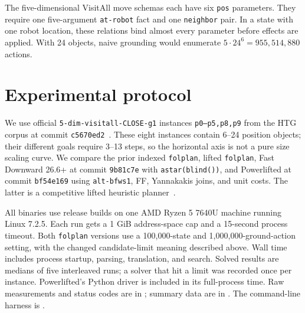 \documentclass[10pt,a4paper]{article}
\begin{document}
The five-dimensional VisitAll move schemas each have six \texttt{pos}
parameters. They require one five-argument \texttt{at-robot} fact and one
\texttt{neighbor} pair. In a state with one robot location, these relations
bind almost every parameter before effects are applied. With 24 objects,
naive grounding would enumerate $5\cdot24^6=955{,}514{,}880$ actions.

\section{Experimental protocol}
We use official \texttt{5-dim-visitall-CLOSE-g1} instances
\texttt{p0--p5,p8,p9} from the HTG corpus at commit
\texttt{c5670ed2}~\cite{htg}.
These eight instances contain 6--24 position objects; their different
goals require 3--13 steps, so the horizontal axis is not a pure size
scaling curve. We compare the prior indexed \texttt{folplan}, lifted
\texttt{folplan}, Fast Downward 26.6+ at commit \texttt{9b81c7e} with
\texttt{astar(blind())}, and Powerlifted at commit \texttt{bf54e169}
using \texttt{alt-bfws1}, FF, Yannakakis joins, and unit costs. The latter
is a competitive lifted heuristic planner~\cite{powerlifted}.

All binaries use release builds on one AMD Ryzen 5 7640U machine running
Linux 7.2.5. Each run gets a 1 GiB address-space cap and a 15-second
process timeout. Both \texttt{folplan} versions use a 100{,}000-state and
1{,}000{,}000-ground-action setting, with the changed candidate-limit
meaning described above. Wall time includes process startup, parsing,
translation, and search. Solved results are medians of five interleaved
runs; a solver that hit a limit was recorded once per instance. Powerlifted's
Python driver is included in its full-process time. Raw measurements and
status codes are in ; summary
data are in .
The command-line harness is .
\end{document}

